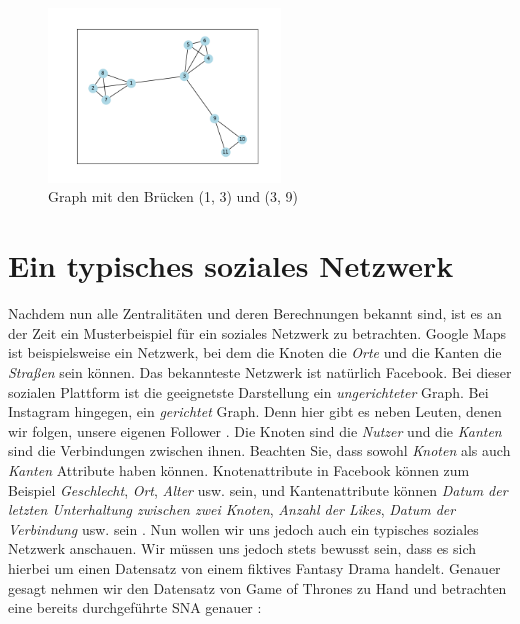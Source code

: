 \FloatBarrier
\begin{figure}[htb!]
    \centering
    \includegraphics[width=0.55\textwidth]{Graphics/Bridge.png}
    \caption{Graph mit den Brücken (1, 3) und (3, 9)}
    \label{fig:Bridge}
\end{figure}

\section{Ein typisches soziales Netzwerk}
Nachdem nun alle Zentralitäten und deren Berechnungen bekannt sind, ist es an der Zeit ein Musterbeispiel für ein soziales Netzwerk zu betrachten. Google Maps ist beispielsweise ein Netzwerk, bei dem die Knoten die \textit{Orte} und die Kanten die \textit{Straßen} sein können. Das bekannteste Netzwerk ist natürlich Facebook. Bei dieser sozialen Plattform ist die geeignetste Darstellung ein \textit{ungerichteter} Graph. Bei Instagram hingegen, ein \textit{gerichtet} Graph. Denn hier gibt es neben Leuten, denen wir folgen, unsere eigenen Follower \cite{fbInsta}. Die Knoten sind die \textit{Nutzer} und die \textit{Kanten} sind die Verbindungen zwischen ihnen. Beachten Sie, dass sowohl \textit{Knoten} als auch \textit{Kanten} Attribute haben können. Knotenattribute in Facebook können zum Beispiel \textit{Geschlecht}, \textit{Ort}, \textit{Alter} usw. sein, und Kantenattribute können \textit{Datum der letzten Unterhaltung zwischen zwei Knoten}, \textit{Anzahl der Likes}, \textit{Datum der Verbindung} usw. sein \cite{GOT}.
Nun wollen wir uns jedoch auch ein typisches soziales Netzwerk anschauen. Wir müssen uns jedoch stets bewusst sein, dass es sich hierbei um einen Datensatz von einem fiktives Fantasy Drama handelt. Genauer gesagt nehmen wir den Datensatz von Game of Thrones zu Hand und betrachten eine bereits durchgeführte SNA genauer \cite{GOT}:

